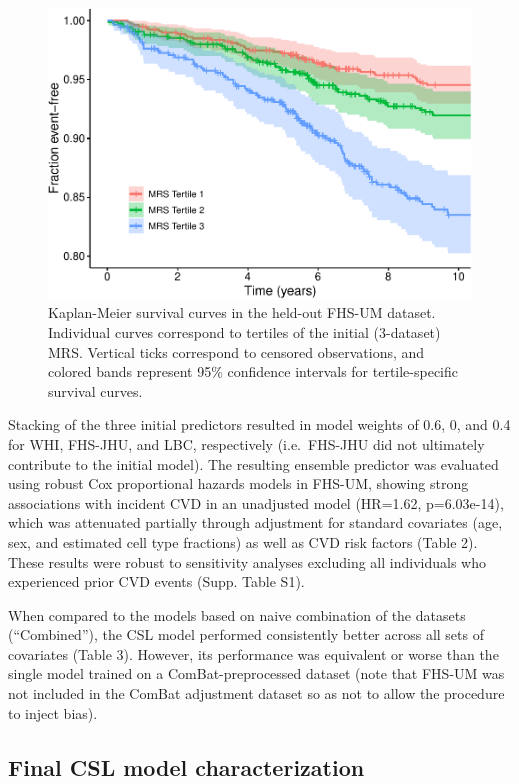 \documentclass[]{article}
\begin{document}
\begin{figure}
\centering
\includegraphics{figures/km-plot-1.pdf}
\caption{Kaplan-Meier survival curves in the held-out FHS-UM dataset.
Individual curves correspond to tertiles of the initial (3-dataset) MRS.
Vertical ticks correspond to censored observations, and colored bands
represent 95\% confidence intervals for tertile-specific survival
curves.}
\end{figure}

Stacking of the three initial predictors resulted in model weights of
0.6, 0, and 0.4 for WHI, FHS-JHU, and LBC, respectively (i.e.~FHS-JHU
did not ultimately contribute to the initial model). The resulting
ensemble predictor was evaluated using robust Cox proportional hazards
models in FHS-UM, showing strong associations with incident CVD in an
unadjusted model (HR=1.62, p=6.03e-14), which was attenuated partially
through adjustment for standard covariates (age, sex, and estimated cell
type fractions) as well as CVD risk factors (Table 2). These results
were robust to sensitivity analyses excluding all individuals who
experienced prior CVD events (Supp. Table S1).

When compared to the models based on naive combination of the datasets
(``Combined''), the CSL model performed consistently better across all
sets of covariates (Table 3). However, its performance was equivalent or
worse than the single model trained on a ComBat-preprocessed dataset
(note that FHS-UM was not included in the ComBat adjustment dataset so
as not to allow the procedure to inject bias).

\hypertarget{final-csl-model-characterization}{%
\subsection{Final CSL model
characterization}\label{final-csl-model-characterization}}
\end{document}
